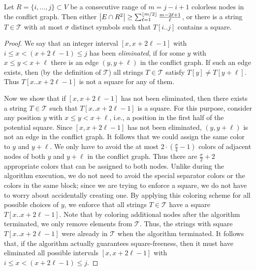 \begin{lemma}\label{lem:MLrestated}
Let $R = \{i,\dots,j\} \subset V$ be a consecutive range of $m = j - i + 1$ colorless nodes in the conflict graph. Then either $\left\lvert E \cap R^2\right\rvert \geq \sum_{\ell = 1}^{\left\lfloor m / 2\right\rfloor} \frac{m - 2\ell + 1}{\ell}$, or there is a string $T \in \mathcal T$ with at most $\sigma$ distinct symbols such that $T[i..j]$ contains a square.
\end{lemma}
\begin{proof}
We say that an integer interval $[x,x+2\ell-1]$ with $i \leq x < (x + 2\ell - 1) \leq j$ has been \emph{eliminated}, if for some $y$ with $x \leq y < x + \ell$ there is an edge $(y, y + \ell)$ in the conflict graph.
If such an edge exists, then (by the definition of $\mathcal T$) all strings $T \in \mathcal T$ satisfy $T[y] \neq T[y + \ell]$. Thus $T[x..x+2\ell-1]$ is not a square for any of them.

Now we show that if $[x, x+2\ell-1]$ has not been eliminated, then there exists a string $T \in \mathcal T$ such that $T[x..x+2\ell-1]$ is a square.
For this purpose, consider any position $y$ with $x \leq y < x + \ell$, i.e., a position in the first half of the potential square.
Since $[x, x+2\ell-1]$ has not been eliminated, $(y, y + \ell)$ is not an edge in the conflict graph. It follows that we could assign the same color to $y$ and $y + \ell$. 
We only have to avoid the at most $2 \cdot (\frac \sigma 4 - 1)$ colors of adjacent nodes of both $y$ and $y + \ell$ in the conflict graph. 
Thus there are $\frac \sigma 2 + 2$ appropriate colors that can be assigned to both nodes. Unlike during the algorithm execution, we do not need to avoid the special separator colors or the colors in the same block; since we are trying to enforce a square, we do not have to worry about accidentally creating one.
By applying this coloring scheme for all possible choices of $y$, we enforce that all strings $T \in \mathcal T$ have a square $T[x..x+2\ell-1]$. 
Note that by coloring additional nodes after the algorithm terminated, we only remove elements from $\mathcal T$. Thus, the strings with square $T[x..x+2\ell-1]$ were already in $\mathcal T$ when the algorithm terminated.
It follows that, if the algorithm actually guarantees square-freeness, then it must have eliminated all possible intervals $[x,x+2\ell-1]$ with $i \leq x < (x + 2\ell - 1) \leq j$.


\end{proof}
